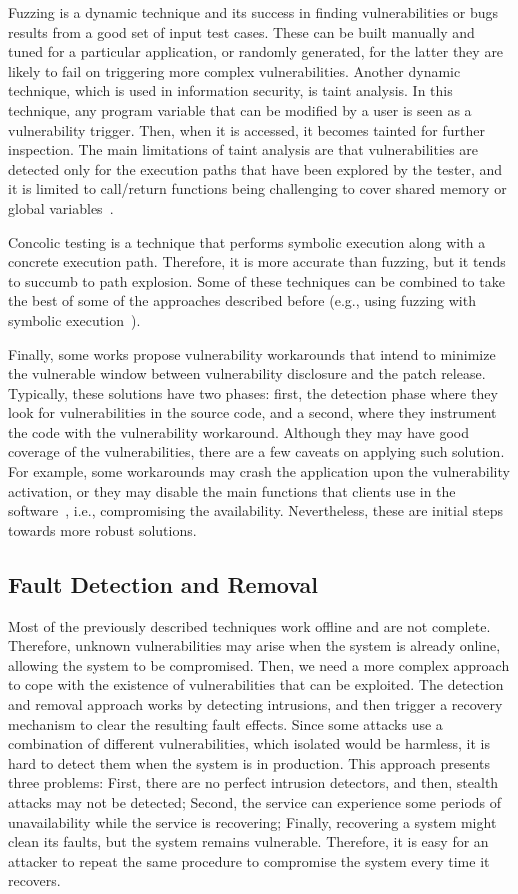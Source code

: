 Fuzzing is a dynamic technique and its success in finding vulnerabilities or bugs results from a good set of input test cases.
These can be built manually and tuned for a particular application, or randomly generated, for the latter they are likely to fail on triggering more complex vulnerabilities.
Another dynamic technique, which is used in information security, is taint analysis.
In this technique, any program variable that can be modified by a user is seen as a vulnerability trigger. 
Then, when it is accessed, it becomes tainted for further inspection.
The main limitations of taint analysis are that vulnerabilities are detected only for the execution paths that have been explored by the tester, and it is limited to call/return functions being challenging to cover shared memory or global variables~\cite{Yamaguchi:2015}.

Concolic testing is a technique that performs symbolic execution along with a concrete execution path. 
Therefore, it is more accurate than fuzzing, but it tends to succumb to path explosion.
Some of these techniques can be combined to take the best of some of the approaches described before (e.g., using fuzzing with symbolic execution~\cite{Stephens:2016}).

Finally, some works propose vulnerability workarounds that intend to minimize the vulnerable window between vulnerability disclosure and the patch release.
Typically, these solutions have two phases: first, the detection phase where they look for vulnerabilities in the source code, and a second, where they instrument the code with the vulnerability workaround.
Although they may have good coverage of the vulnerabilities, there are a few caveats on applying such solution.
For example, some workarounds may crash the application upon the vulnerability activation, or they may disable the main functions that clients use in the software~\cite{Huang:2016}, i.e., compromising the availability. 
Nevertheless, these are initial steps towards more robust solutions.

\subsection{Fault Detection and Removal}
Most of the previously described techniques work offline and are not complete. 
Therefore, unknown vulnerabilities may arise when the system is already online, allowing the system to be compromised.
Then, we need a more complex approach to cope with the existence of vulnerabilities that can be exploited.
The detection and removal approach works by detecting intrusions, and then trigger a recovery mechanism to clear the resulting fault effects. 
Since some attacks use a combination of different vulnerabilities, which isolated would be harmless, it is hard to detect them when the system is in production. 
This approach presents three problems: 
First, there are no perfect intrusion detectors, and then, stealth attacks may not be detected; 
Second, the service can experience some periods of unavailability while the service is recovering; 
Finally, recovering a system might clean its faults, but the system remains vulnerable.
Therefore, it is easy for an attacker to repeat the same procedure to compromise the system every time it recovers.


